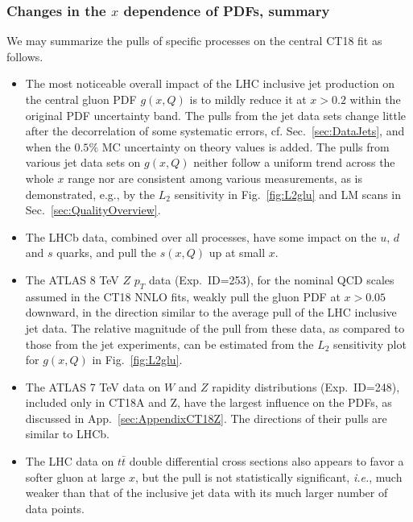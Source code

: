 \subsubsection{Changes in the $x$ dependence of PDFs, summary}
We may summarize the pulls of specific processes on the central CT18 fit as follows. 

\begin{itemize}

\item The most noticeable overall impact of the LHC inclusive jet
  production on the central gluon PDF $g(x,Q)$ is to mildly reduce it
  at $x > 0.2$ within the original PDF uncertainty band. The pulls
  from the jet data sets change little after the decorrelation of some
  systematic errors, cf. Sec.~\ref{sec:DataJets},
  and when the $0.5\%$ MC uncertainty on theory values is added.
The pulls from various jet data sets on $g(x,Q)$ neither follow a
uniform trend across the whole $x$ range nor are consistent among
various measurements, as is demonstrated, e.g., by the $L_2$
sensitivity in Fig.~\ref{fig:L2glu} and LM scans in
Sec.~\ref{sec:QualityOverview}. 

\item The LHCb data, combined over all processes, have some impact on
  the $u$, $d$ and $s$ quarks, and pull the $s (x,Q)$ up at small $x$.   

\item The ATLAS 8 TeV $Z$ $p_T$ data (Exp.~ID=253), for the nominal
  QCD scales assumed in the CT18 NNLO fits, weakly pull the gluon PDF
  at $x>0.05$ downward, in the direction similar to the average pull
  of the LHC inclusive jet data. The relative magnitude of the pull
  from these data, as compared to those from the jet experiments,
  can be estimated from the $L_2$ sensitivity plot
  for $g(x,Q)$ in Fig.~\ref{fig:L2glu}.

\item The ATLAS 7 TeV data on $W$ and $Z$ rapidity distributions
  (Exp.~ID=248), included only in CT18A and Z, have the largest
  influence on the PDFs, as discussed in
  App.~\ref{sec:AppendixCT18Z}. The directions of their pulls are
  similar to LHCb. 

\item The LHC data on $t \bar t$ double differential cross sections
  also appears to favor a softer gluon at large $x$, but the pull is
  not statistically significant, {\it i.e.}, much weaker than that of
  the inclusive jet data with its much larger number of data points.  

\end{itemize}

